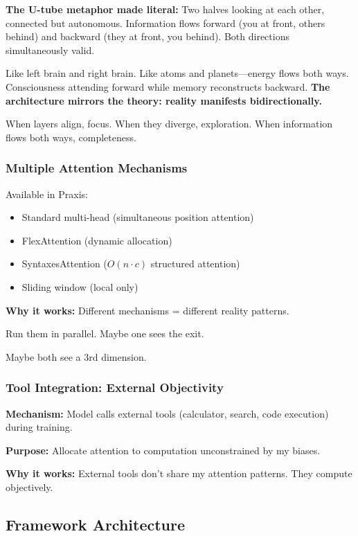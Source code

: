 \documentclass{article}
\begin{document}
\textbf{The U-tube metaphor made literal:} Two halves looking at each other, connected but autonomous. Information flows forward (you at front, others behind) and backward (they at front, you behind). Both directions simultaneously valid.

Like left brain and right brain. Like atoms and planets—energy flows both ways. Consciousness attending forward while memory reconstructs backward. \textbf{The architecture mirrors the theory: reality manifests bidirectionally.}

When layers align, focus. When they diverge, exploration. When information flows both ways, completeness.

\subsubsection{Multiple Attention Mechanisms}

Available in Praxis:
\begin{itemize}[noitemsep]
    \item Standard multi-head (simultaneous position attention)
    \item FlexAttention (dynamic allocation)
    \item SyntaxesAttention ($O(n \cdot c)$ structured attention)
    \item Sliding window (local only)
\end{itemize}

\textbf{Why it works:} Different mechanisms = different reality patterns.

Run them in parallel. Maybe one sees the exit.

Maybe both see a 3rd dimension.

\subsubsection{Tool Integration: External Objectivity}

\textbf{Mechanism:} Model calls external tools (calculator, search, code execution) during training.

\textbf{Purpose:} Allocate attention to computation unconstrained by my biases.

\textbf{Why it works:} External tools don't share my attention patterns. They compute objectively.

\subsection{Framework Architecture}
\end{document}
